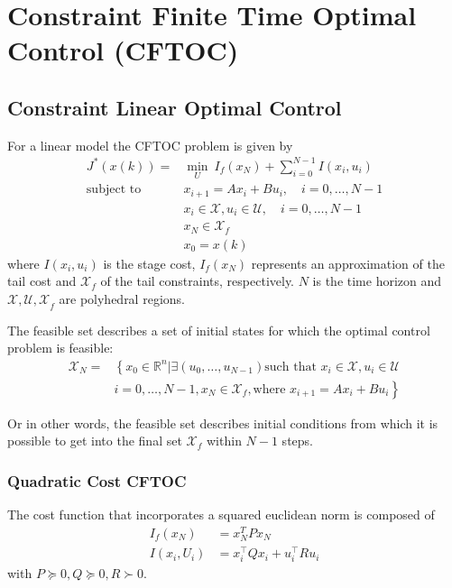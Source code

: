 \section{Constraint Finite Time Optimal Control (CFTOC)}

\subsection{Constraint Linear Optimal Control}

For a linear model the CFTOC problem is given by
\begin{align*}
    J^*(x(k)) =            & \min_U \: I_f(x_N) + \sum_{i=0}^{N-1}I(x_i,u_i)                    \\
    \text{subject to}\quad & x_{i+1} = Ax_i +Bu_i, \quad i = 0, \ldots, N-1                     \\
                           & x_i \in \mathcal{X}, u_i \in \mathcal{U}, \quad i = 0, \ldots, N-1 \\
                           & x_N \in \mathcal{X}_f                                              \\
                           & x_0 = x(k)
\end{align*}
where $I(x_i,u_i)$ is the stage cost, $I_f(x_N)$ represents an approximation of the tail cost and $\mathcal{X}_f$ of the tail constraints, respectively. $N$ is the time horizon and $\mathcal{X,U,X}_f$ are polyhedral regions.

\newpar{}

The feasible set describes a set of initial states for which the optimal control problem is feasible:
\begin{align*}
    \mathcal{X}_N = & \left\{ x_0 \in \mathbb{R}^n | \exists\left(u_0, \ldots, u_{N-1}\right) \text{such that } x_i\in\mathcal{X}, u_i\in\mathcal{U} \right. \\
                    & \left.i=0,\ldots, N-1, x_N\in\mathcal{X}_f, \text{where } x_{i+1}=Ax_i + Bu_i\right\}
\end{align*}

Or in other words, the feasible set describes initial conditions from which it is possible to get into the final set $\mathcal{X}_f$ within $N-1$ steps.

\subsubsection{Quadratic Cost CFTOC}

The cost function that incorporates a squared euclidean norm is composed of
\begin{align*}
    I_f(x_N)   & = x_N^T P x_N                     \\
    I(x_i,U_i) & = x_i^\top Q x_i + u_i^\top R u_i
\end{align*}
with $P\succeq0, Q\succeq0, R\succ0$.

